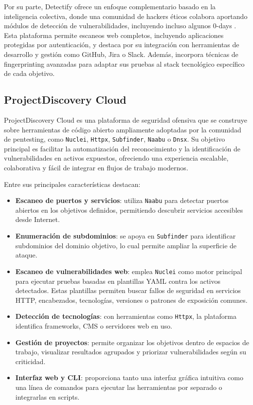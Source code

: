 \begin{parskipenv}
Por su parte, Detectify \cite{detectify} ofrece un enfoque complementario basado en la inteligencia colectiva, donde una comunidad de hackers éticos colabora aportando módulos de detección de vulnerabilidades, incluyendo incluso algunos 0-days \cite{0day}. Esta plataforma permite escaneos web completos, incluyendo aplicaciones protegidas por autenticación, y destaca por su integración con herramientas de desarrollo y gestión como GitHub, Jira o Slack. Además, incorpora técnicas de fingerprinting avanzadas para adaptar sus pruebas al stack tecnológico específico de cada objetivo.

\subsection{ProjectDiscovery Cloud}

ProjectDiscovery Cloud es una plataforma de seguridad ofensiva que se construye sobre herramientas de código abierto ampliamente adoptadas por la comunidad de pentesting, como \texttt{Nuclei}, \texttt{Httpx}, \texttt{Subfinder}, \texttt{Naabu} o \texttt{Dnsx}. Su objetivo principal es facilitar la automatización del reconocimiento y la identificación de vulnerabilidades en activos expuestos, ofreciendo una experiencia escalable, colaborativa y fácil de integrar en flujos de trabajo modernos.

Entre sus principales características destacan:

\begin{itemize}
  \item \textbf{Escaneo de puertos y servicios}: utiliza \texttt{Naabu} para detectar puertos abiertos en los objetivos definidos, permitiendo descubrir servicios accesibles desde Internet. 
  \item \textbf{Enumeración de subdominios}: se apoya en \texttt{Subfinder} para identificar subdominios del dominio objetivo, lo cual permite ampliar la superficie de ataque.
  \item \textbf{Escaneo de vulnerabilidades web}: emplea \texttt{Nuclei} como motor principal para ejecutar pruebas basadas en plantillas YAML contra los activos detectados. Estas plantillas permiten buscar fallos de seguridad en servicios HTTP, encabezados, tecnologías, versiones o patrones de exposición comunes.
  \item \textbf{Detección de tecnologías}: con herramientas como \texttt{Httpx}, la plataforma identifica frameworks, CMS o servidores web en uso.
  \item \textbf{Gestión de proyectos}: permite organizar los objetivos dentro de espacios de trabajo, visualizar resultados agrupados y priorizar vulnerabilidades según su criticidad.
  \item \textbf{Interfaz web y CLI}: proporciona tanto una interfaz gráfica intuitiva como una línea de comandos para ejecutar las herramientas por separado o integrarlas en scripts.
\end{itemize}


\end{parskipenv}
